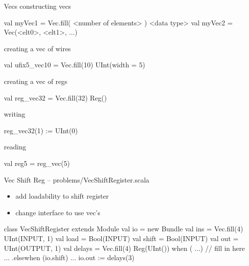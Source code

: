 \documentclass[xcolor=pdflatex,dvipsnames,table]{beamer}
\begin{document}
\begin{frame}[fragile]{Vecs}
constructing vecs
\begin{scala}
val myVec1 = Vec.fill( <number of elements> ) { <data type> }
val myVec2 = Vec(<elt0>, <elt1>, ...)
\end{scala}

creating a vec of wires
\begin{scala}
val ufix5_vec10 = Vec.fill(10) { UInt(width = 5) }
\end{scala}


creating a vec of regs
\begin{scala}
val reg_vec32 = Vec.fill(32){ Reg() }
\end{scala}

writing
\begin{scala}
reg_vec32(1) := UInt(0)
\end{scala}

reading
\begin{scala}
val reg5 = reg_vec(5)
\end{scala}

\end{frame}

\begin{frame}[fragile]{Vec Shift Reg -- problems/VecShiftRegister.scala}

\begin{itemize}
\item add loadability to shift register
\item change interface to use vec's
\end{itemize}

{
\begin{scala}
class VecShiftRegister extends Module {
  val io = new Bundle {
    val ins   = Vec.fill(4){ UInt(INPUT, 1) }
    val load  = Bool(INPUT)
    val shift = Bool(INPUT)
    val out   = UInt(OUTPUT, 1)
  }
  val delays = Vec.fill(4){ Reg(UInt()) }
  when ( ...) {
  // fill in here ...
  } .elsewhen (io.shift) {
    ...
  }
  io.out := delays(3)
}
\end{scala}
}

\end{frame}

\end{document}
